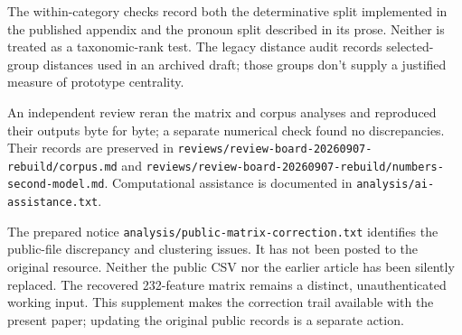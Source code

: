 \documentclass[12pt]{article}
\begin{document}
The within-category checks record both the determinative split implemented in the published appendix and the pronoun split described in its prose. Neither is treated as a taxonomic-rank test. The legacy distance audit records selected-group distances used in an archived draft; those groups don't supply a justified measure of prototype centrality.

An independent review reran the matrix and corpus analyses and reproduced their outputs byte for byte; a separate numerical check found no discrepancies. Their records are preserved in \nolinkurl{reviews/review-board-20260907-rebuild/corpus.md} and \nolinkurl{reviews/review-board-20260907-rebuild/numbers-second-model.md}. Computational assistance is documented in \nolinkurl{analysis/ai-assistance.txt}.

The prepared notice \nolinkurl{analysis/public-matrix-correction.txt} identifies the public-file discrepancy and clustering issues. It has not been posted to the original resource. Neither the public CSV nor the earlier article has been silently replaced. The recovered 232-feature matrix remains a distinct, unauthenticated working input. This supplement makes the correction trail available with the present paper; updating the original public records is a separate action.

\printbibliography
\end{document}
